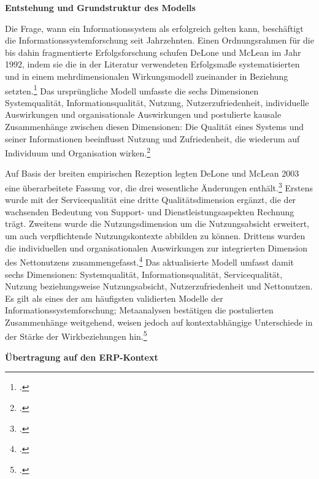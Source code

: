 \textbf{Entstehung und Grundstruktur des Modells}

Die Frage, wann ein Informationssystem als erfolgreich gelten kann, besch\"aftigt die Informationssystemforschung seit Jahrzehnten. Einen Ordnungsrahmen f\"ur die bis dahin fragmentierte Erfolgsforschung schufen DeLone und McLean im Jahr 1992, indem sie die in der Literatur verwendeten Erfolgsma\ss{}e systematisierten und in einem mehrdimensionalen Wirkungsmodell zueinander in Beziehung setzten.\footcite[Vgl.][S.~60--63]{delone1992} Das urspr\"ungliche Modell umfasste die sechs Dimensionen Systemqualit\"at, Informationsqualit\"at, Nutzung, Nutzerzufriedenheit, individuelle Auswirkungen und organisationale Auswirkungen und postulierte kausale Zusammenh\"ange zwischen diesen Dimensionen: Die Qualit\"at eines Systems und seiner Informationen beeinflusst Nutzung und Zufriedenheit, die wiederum auf Individuum und Organisation wirken.\footcite[Vgl.][S.~83--87]{delone1992}

Auf Basis der breiten empirischen Rezeption legten DeLone und McLean 2003 eine \"uberarbeitete Fassung vor, die drei wesentliche \"Anderungen enth\"alt.\footcite[Vgl.][S.~9--10]{delone2003} Erstens wurde mit der Servicequalit\"at eine dritte Qualit\"atsdimension erg\"anzt, die der wachsenden Bedeutung von Support- und Dienstleistungsaspekten Rechnung tr\"agt. Zweitens wurde die Nutzungsdimension um die Nutzungsabsicht erweitert, um auch verpflichtende Nutzungskontexte abbilden zu k\"onnen. Drittens wurden die individuellen und organisationalen Auswirkungen zur integrierten Dimension des Nettonutzens zusammengefasst.\footcite[Vgl.][S.~22--27]{delone2003} Das aktualisierte Modell umfasst damit sechs Dimensionen: Systemqualit\"at, Informationsqualit\"at, Servicequalit\"at, Nutzung beziehungsweise Nutzungsabsicht, Nutzerzufriedenheit und Nettonutzen. Es gilt als eines der am h\"aufigsten validierten Modelle der Informationssystemforschung; Metaanalysen best\"atigen die postulierten Zusammenh\"ange weitgehend, weisen jedoch auf kontextabh\"angige Unterschiede in der St\"arke der Wirkbeziehungen hin.\footcite[Vgl.][S.~236--239]{petter2008}

\textbf{\"Ubertragung auf den ERP-Kontext}


